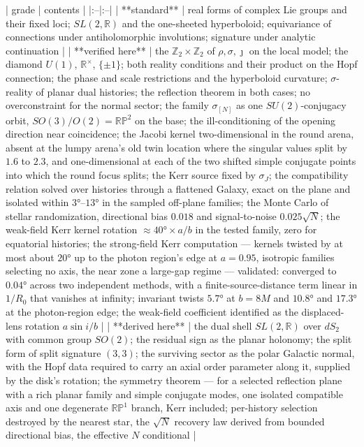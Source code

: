 | grade | contents |
|:--|:--|
| **standard** | real forms of complex Lie groups and their fixed loci; $SL(2,\mathbb R)$ and the one-sheeted hyperboloid; equivariance of connections under antiholomorphic involutions; signature under analytic continuation |
| **verified here** | the $\mathbb Z_2\times\mathbb Z_2$ of $\rho,\sigma,\jmath$ on the local model; the diamond $U(1)$, $\mathbb R^\times$, $\{\pm1\}$; both reality conditions and their product on the Hopf connection; the phase and scale restrictions and the hyperboloid curvature; $\sigma$-reality of planar dual histories; the reflection theorem in both cases; no overconstraint for the normal sector; the family $\sigma_{[N]}$ as one $SU(2)$-conjugacy orbit, $SO(3)/O(2) = \mathbb{RP}^2$ on the base; the ill-conditioning of the opening direction near coincidence; the Jacobi kernel two-dimensional in the round arena, absent at the lumpy arena's old twin location where the singular values split by $1.6$ to $2.3$, and one-dimensional at each of the two shifted simple conjugate points into which the round focus splits; the Kerr source fixed by $\sigma_J$; the compatibility relation solved over histories through a flattened Galaxy, exact on the plane and isolated within $3°$–$13°$ in the sampled off-plane families; the Monte Carlo of stellar randomization, directional bias $0.018$ and signal-to-noise $0.025\sqrt N$; the weak-field Kerr kernel rotation $\approx40°\times a/b$ in the tested family, zero for equatorial histories; the strong-field Kerr computation — kernels twisted by at most about $20°$ up to the photon region's edge at $a = 0.95$, isotropic families selecting no axis, the near zone a large-gap regime — validated: converged to $0.04°$ across two independent methods, with a finite-source-distance term linear in $1/R_0$ that vanishes at infinity; invariant twists $5.7°$ at $b = 8M$ and $10.8°$ and $17.3°$ at the photon-region edge; the weak-field coefficient identified as the displaced-lens rotation $a\sin i/b$ |
| **derived here** | the dual shell $SL(2,\mathbb R)$ over $dS_2$ with common group $SO(2)$; the residual sign as the planar holonomy; the split form of split signature $(3,3)$; the surviving sector as the polar Galactic normal, with the Hopf data required to carry an axial order parameter along it, supplied by the disk's rotation; the symmetry theorem — for a selected reflection plane with a rich planar family and simple conjugate modes, one isolated compatible axis and one degenerate $\mathbb{RP}^1$ branch, Kerr included; per-history selection destroyed by the nearest star, the $\sqrt N$ recovery law derived from bounded directional bias, the effective $N$ conditional |
